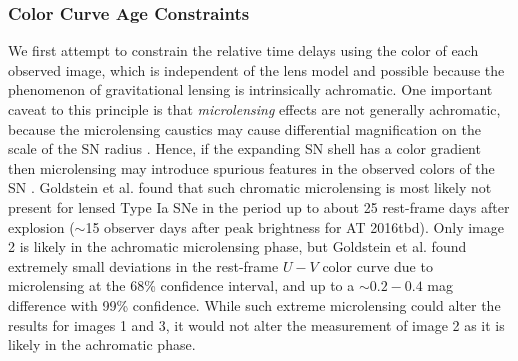\documentclass[12pt]{article}
\def\SNABC{AT 2016tbd\xspace}
\begin{document}

\subsubsection*{Color Curve Age Constraints}

We first attempt to constrain the relative time delays using the color of each observed image, which is independent of the lens model and possible because the phenomenon of gravitational lensing is intrinsically achromatic. One important caveat to this principle is that {\it microlensing} effects are not generally achromatic, because the microlensing caustics may cause differential magnification on the scale of the SN radius \cite{goldstein_precise_2018,foxley-marrable_impact_2018,bonvin_impact_2019}.  Hence, if the expanding SN shell has a color gradient then microlensing may introduce spurious features in the observed colors of the SN \cite{kochanek_quantitative_2004,vernardos_joint_2018}.   Goldstein et al. \cite{goldstein_precise_2018} found that such chromatic microlensing is most likely not present for lensed Type Ia SNe in the period up to about 25 rest-frame days after explosion ($\sim$15 observer days after peak brightness for \SNABC). Only image 2 is likely in the achromatic microlensing phase, but Goldstein et al. \cite{goldstein_precise_2018} found extremely small deviations in the rest-frame $U-V$ color curve due to microlensing at the 68\% confidence interval, and up to a $\sim0.2-0.4$ mag difference with 99\% confidence. While such extreme microlensing could alter the results for images 1 and 3, it would not alter the measurement of image 2 as it is likely in the achromatic phase.
\end{document}
